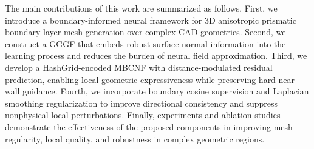 \documentclass[%
 aip,
 amsmath,amssymb,
 reprint,%
nobibnotes,
]{revtex4-1}
\begin{document}
The main contributions of this work are summarized as follows. First, we introduce a boundary-informed neural framework for 3D anisotropic prismatic boundary-layer mesh generation over complex CAD geometries. Second, we construct a GGGF that embeds robust surface-normal information into the learning process and reduces the burden of neural field approximation. Third, we develop a HashGrid-encoded MBCNF with distance-modulated residual prediction, enabling local geometric expressiveness while preserving hard near-wall guidance. Fourth, we incorporate boundary cosine supervision and Laplacian smoothing regularization to improve directional consistency and suppress nonphysical local perturbations. Finally, experiments and ablation studies demonstrate the effectiveness of the proposed components in improving mesh regularity, local quality, and robustness in complex geometric regions.





\end{document}
